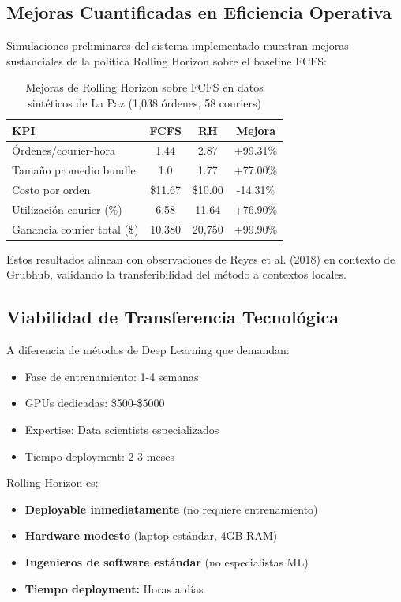 \subsection{Mejoras Cuantificadas en Eficiencia Operativa}

Simulaciones preliminares del sistema implementado muestran mejoras sustanciales 
de la política Rolling Horizon sobre el baseline FCFS:

\begin{table}[h]
\centering
\begin{tabular}{|l|c|c|c|}
\hline
\textbf{KPI} & \textbf{FCFS} & \textbf{RH} & \textbf{Mejora} \\
\hline
Órdenes/courier-hora & 1.44 & 2.87 & +99.31\% \\
\hline
Tamaño promedio bundle & 1.0 & 1.77 & +77.00\% \\
\hline
Costo por orden & \$11.67 & \$10.00 & -14.31\% \\
\hline
Utilización courier (\%) & 6.58 & 11.64 & +76.90\% \\
\hline
Ganancia courier total (\$) & 10,380 & 20,750 & +99.90\% \\
\hline
\end{tabular}
\caption{Mejoras de Rolling Horizon sobre FCFS en datos sintéticos de La Paz (1,038 órdenes, 58 couriers)}
\end{table}

Estos resultados alinean con observaciones de Reyes et al. (2018) en contexto 
de Grubhub, validando la transferibilidad del método a contextos locales.

\subsection{Viabilidad de Transferencia Tecnológica}

A diferencia de métodos de Deep Learning que demandan:

\begin{itemize}
    \item Fase de entrenamiento: 1-4 semanas
    \item GPUs dedicadas: \$500-\$5000
    \item Expertise: Data scientists especializados
    \item Tiempo deployment: 2-3 meses
\end{itemize}

Rolling Horizon es:

\begin{itemize}
    \item \textbf{Deployable inmediatamente} (no requiere entrenamiento)
    \item \textbf{Hardware modesto} (laptop estándar, 4GB RAM)
    \item \textbf{Ingenieros de software estándar} (no especialistas ML)
    \item \textbf{Tiempo deployment:} Horas a días
\end{itemize}


